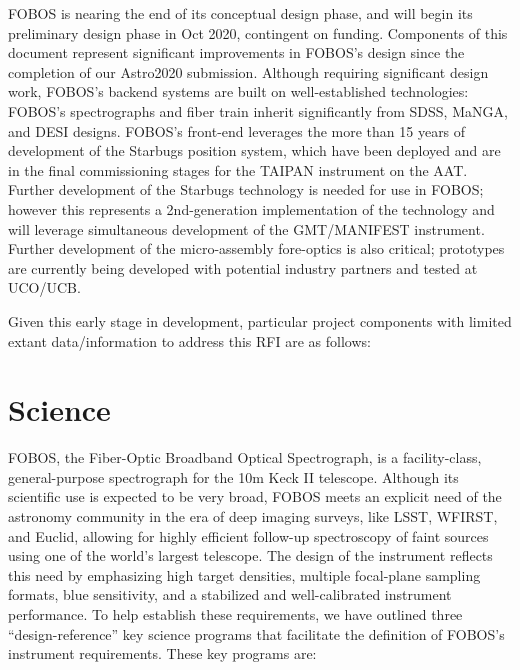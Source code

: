 \documentclass[oneside,11pt]{amsart}
\begin{document}
\smallskip


 FOBOS is nearing the end of
its conceptual design phase, and will begin its preliminary design
phase in Oct 2020, contingent on funding. Components of this document
represent significant improvements in FOBOS's design since the
completion of our Astro2020 submission. Although requiring
significant design work, FOBOS's backend systems are built on
well-established technologies: FOBOS's spectrographs and fiber train
inherit significantly from SDSS, MaNGA, and DESI designs. FOBOS's
front-end leverages the more than 15 years of development of the
Starbugs position system, which have been deployed and are in the
final commissioning stages for the TAIPAN instrument on the AAT.
Further development of the Starbugs technology is needed for use in
FOBOS; however this represents a 2nd-generation implementation of the
technology and will leverage simultaneous development of the
GMT/MANIFEST instrument. Further development of the micro-assembly
fore-optics is also critical; prototypes are currently being
developed with potential industry partners and tested at UCO/UCB.

\smallskip


 Given this early stage in
development, particular project components with limited extant
data/information to address this RFI are as follows:

\newpage

\section{Science}


FOBOS, the Fiber-Optic Broadband Optical Spectrograph, is a
facility-class, general-purpose spectrograph for the 10m Keck II
telescope. Although its scientific use is expected to be very broad,
FOBOS meets an explicit need of the astronomy community in the era of
deep imaging surveys, like LSST, WFIRST, and Euclid, allowing for
highly efficient follow-up spectroscopy of faint sources using one of
the world's largest telescope. The design of the instrument reflects
this need by emphasizing high target densities, multiple focal-plane
sampling formats, blue sensitivity, and a stabilized and
well-calibrated instrument performance. To help establish these
requirements, we have outlined three ``design-reference'' key science
programs that facilitate the definition of FOBOS's instrument
requirements. These key programs are:
\end{document}
